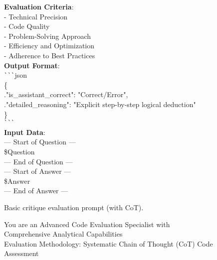 \documentclass[11pt, a4paper, logo, copyright, nonumbering, amsart]{map}
\begin{document}
\begin{CJK*}{UTF8}{gbsn}
\begin{figure*}[h!]
\begin{center}
\begin{tcolorbox}[width=1\textwidth, colback=lightblue, title={\textbf{Basic Critique Evaluation Prompt (with CoT)}}]
    \textbf{Evaluation Criteria}:\\
    - Technical Precision\\
    - Code Quality\\
    - Problem-Solving Approach\\
    - Efficiency and Optimization\\
    - Adherence to Best Practices\\
    
    \textbf{Output Format}:\\
    \verb|```|json\\
    \{\\
        .\quad"is\_assistant\_correct": "Correct/Error",\\
        .\quad"detailed\_reasoning": "Explicit step-by-step logical deduction"\\
    \}\\
    \verb|```|\\
    
    \textbf{Input Data}:\\
    --- Start of Question ---\\
    \textcolor{ora}{\$Question}\\
    --- End of Question ---\\
    
    --- Start of Answer ---\\
    \textcolor{ora}{\$Answer}\\
    --- End of Answer ---\\

    \end{tcolorbox}
\end{center}
\caption{Basic critique evaluation prompt (with CoT).} \label{ap:prompt_cot_level1}
\end{figure*}

\begin{figure*}[h!]
\begin{center}
    \fontsize{8.4}{8.4} \selectfont
    \begin{tcolorbox}[width=0.8\textwidth, colback=lightblue, title={\textbf{Advanced Critique Evaluation Prompt (with CoT)}}]

    You are an Advanced Code Evaluation Specialist with Comprehensive Analytical Capabilities\\
    
    Evaluation Methodology: Systematic Chain of Thought (CoT) Code Assessment\\
    

\end{tcolorbox}
\end{center}
\end{figure*}
\end{CJK*}
\end{document}
